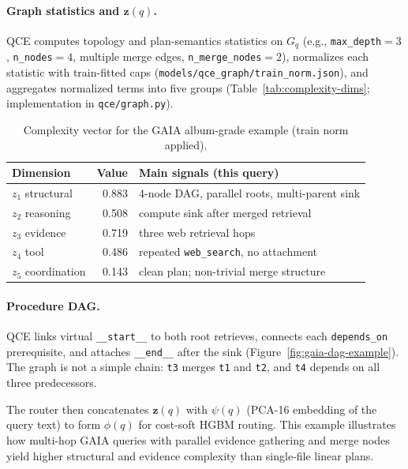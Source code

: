 \paragraph{Graph statistics and $\mathbf{z}(q)$.}
QCE computes topology and plan-semantics statistics on $G_q$ (e.g., \texttt{max\_depth}$=3$,
\texttt{n\_nodes}$=4$, multiple merge edges, \texttt{n\_merge\_nodes}${=}2$),
normalizes each statistic with train-fitted caps (\texttt{models/qce\_graph/train\_norm.json}),
and aggregates normalized terms into five groups
(Table~\ref{tab:complexity-dims}; implementation in \texttt{qce/graph.py}).

\begin{table}[h]
  \centering
  \footnotesize
  \caption{Complexity vector for the GAIA album-grade example (train norm applied).}
  \label{tab:gaia-cq}
  \begin{tabular}{@{}lrl@{}}
    \toprule
    Dimension & Value & Main signals (this query) \\
    \midrule
    $z_1$ structural & 0.883 & 4-node DAG, parallel roots, multi-parent sink \\
    $z_2$ reasoning & 0.508 & compute sink after merged retrieval \\
    $z_3$ evidence & 0.719 & three web retrieval hops \\
    $z_4$ tool & 0.486 & repeated \texttt{web\_search}, no attachment \\
    $z_5$ coordination & 0.143 & clean plan; non-trivial merge structure \\
    \bottomrule
  \end{tabular}
\end{table}

\paragraph{Procedure DAG.}
QCE links virtual \texttt{\_\_start\_\_} to both root retrieves, connects each
\texttt{depends\_on} prerequisite, and attaches \texttt{\_\_end\_\_} after the sink
(Figure~\ref{fig:gaia-dag-example}).
The graph is not a simple chain: \texttt{t3} merges \texttt{t1} and \texttt{t2}, and
\texttt{t4} depends on all three predecessors.



The router then concatenates $\mathbf{z}(q)$ with $\psi(q)$ (PCA-16 embedding of the query
text) to form $\phi(q)$ for cost-soft HGBM routing.
This example illustrates how multi-hop GAIA queries with parallel evidence gathering and
merge nodes yield higher structural and evidence complexity than single-file linear plans.
